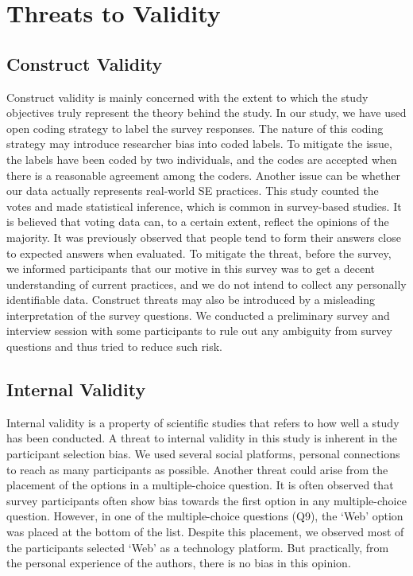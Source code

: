 \section{Threats to Validity}
\label{validity}

\subsection{Construct Validity}
Construct validity is mainly concerned with the extent to which the
study objectives truly represent the theory behind the study\citep{Wohlin2012}. In our study, we have used open coding strategy to label the survey responses. The nature of this coding strategy may introduce researcher bias into coded labels. To mitigate the issue, the labels have been coded by two individuals, and the codes are accepted when there is a reasonable agreement among the coders. Another issue can be whether our data actually represents real-world SE practices. This study counted the votes and made statistical inference, which is common in survey-based studies. It is believed that voting data can, to a certain extent, reflect the opinions of the majority. It was previously observed\citep{Garousi2015} that people tend to form their answers close to expected answers when evaluated. To mitigate the threat, before the survey, we informed participants that our motive in this survey was to get a decent understanding of current practices, and we do not intend to collect any personally identifiable data. Construct threats may also be introduced by a misleading interpretation of the survey questions. We conducted a preliminary survey and interview session with some participants to rule out any ambiguity from survey questions and thus tried to reduce such risk.

\subsection{Internal Validity}
Internal validity is a property of scientific studies that refers to how well a study has been conducted. A threat to internal validity in this study is inherent in the participant selection bias. We used several social platforms, personal connections to reach as many participants as possible. Another threat could arise from the placement of the options in a multiple-choice question. It is often observed that survey participants often show bias towards the first option in any multiple-choice question\citep{Uddin2019}. However, in one of the multiple-choice questions (Q9), the `Web' option was placed at the bottom of the list. Despite this placement, we observed most of the participants selected `Web' as a technology platform. But practically, from the personal experience of the authors, there is no bias in this opinion.


